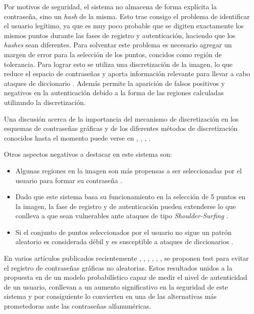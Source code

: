 Por motivos de seguridad, el sistema  no  almacena  de  forma explícita la contraseña,  sino  un \textit{hash} de la  misma.  Esto  trae  consigo  el  problema de identificar el usuario legítimo, ya que es muy poco probable que se digiten exactamente los mismos puntos durante las fases de registro y autenticación, haciendo que los \textit{hashes} sean diferentes. 
Para solventar este problema es necesario agregar un margen de error para la selección de los puntos, concidos como región de tolerancia. Para lograr esto se utiliza una discretización de la imagen, lo que reduce el espacio de contraseñas y aporta información relevante para  llevar  a  cabo  ataques  de  diccionario \cite{zhu2013security}. Además  permite  la  aparición  de  falsos  positivos  y negativos  en  la autenticación  debido  a  la  forma  de  las  regiones  calculadas  utilizando  la  discretización. 

 Una  discusión  acerca  de  la importancia del mecanismo de discretización en los esquemas de contraseñas gráficas y de los diferentes métodos de discretización conocidos hasta el momento puede verse en \cite{birget2006graphical}, \cite{chiasson2008centered}, \cite{bicakci2008optimal}, \cite{kirovski2007click}. 

Otros aspectos negativos a destacar en este sistema son: 

\begin{itemize}
	\item Algunas regiones en la imagen son más propensas a ser seleccionadas por el usuario para formar su contraseña \cite{mypasswordhere}.
	
	\item Dado que este sistema basa su funcionamiento en la selección de 5 puntos en la imagen, la fase de registro y de autenticación pueden extenderse lo que conlleva a que sean vulnerables ante ataques de tipo \textit{Shoulder-Surfing} \cite{rodriguez2019algoritmo}.
	
	\item Si el conjunto de puntos seleccionados por el usuario no sigue un patrón aleatorio es considerada débil y es susceptible a ataques de diccionarios \cite{rodriguez2019algoritmo}.
\end{itemize}

En varios artículos publicados recientemente \cite{sym13050777}, \cite{lissetMaster}, \cite{s22051987}, \cite{herrera2023comparacion}, \cite{herrera2023nuevo}, \cite{herrera2023nuevoregulares}, \cite{herrera2024new} se proponen test para evitar el registro de contraseñas gráficas no aleatorias. Estos resultados unidos a la propuesta en \cite{legon2019nuevo} de un modelo probabilístico capaz de medir el nivel de autenticidad de un usuario, conllevan a un aumento significativo en la seguridad de este sistema y por consiguiente lo convierten en una de las alternativas más prometedoras ante las contraseñas alfanuméricas.



